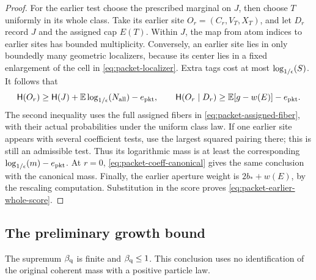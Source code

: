 \begin{proof}
For the earlier test choose the prescribed marginal on \(J\),
then choose \(T\) uniformly in its whole class.  Take its earlier
site \(O_r=(C_r,V_T,X_T)\), and let \(D_r\) record \(J\) and
the assigned cap \(E(T)\).  Within \(J\), the map from atom
indices to earlier sites has bounded multiplicity.  Conversely,
an earlier site lies in only boundedly many geometric localizers,
because its center lies in a fixed enlargement of the cell in
\eqref{eq:packet-localizer}.  Extra tags cost at most \(\log_{1/\epsilon}\!\left(S\right)\).
It follows that
\[
 \mathsf H(O_r)\ge\mathsf H(J)+\mathbb E\log_{1/\epsilon}\!\left(N_{\rm all}\right)-e_{\rm pkt},\qquad
 \mathsf H(O_r\mid D_r)\ge\mathbb E[g-w(E)]-e_{\rm pkt}.
\]
The second inequality uses the full assigned fibers in
\eqref{eq:packet-assigned-fiber}, with their actual probabilities
under the uniform class law.  If one earlier site appears with
several coefficient tests, use the largest squared pairing there;
this is still an admissible test.  Thus its logarithmic mass is
at least the corresponding \(\log_{1/\epsilon}\!\left(m\right)-e_{\rm pkt}\).
At \(r=0\), \eqref{eq:packet-coeff-canonical} gives the same
conclusion with the canonical mass.  Finally, the earlier aperture
weight is \(2b_*+w(E)\), by the rescaling computation.  Substitution
in the score proves \eqref{eq:packet-earlier-whole-score}.
\end{proof}

\subsection{The preliminary growth bound}

\begin{proposition}
\label{prop:packet-trivial-growth}
The supremum \(\beta_{\mathrm q}\) is finite and \(\beta_{\mathrm q}\le1\).
This conclusion uses no identification of the original coherent
mass with a positive particle law.
\end{proposition}

